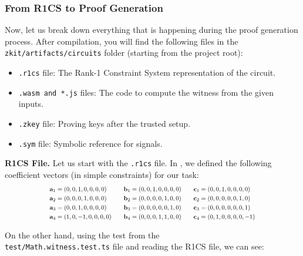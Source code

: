 \documentclass[../lecture-notes-105x135.tex]{subfiles}
\begin{document}
    \subsubsection{From R1CS to Proof Generation}

    Now, let us break down everything that is happening during the proof
    generation process. After compilation, you will find the following files in
    the \texttt{zkit/artifacts/circuits} folder (starting from the project
    root):
    \begin{itemize}
        \item \texttt{.r1cs} file: The Rank-1 Constraint System representation of the circuit.
        \item \texttt{.wasm and *.js} files: The code to compute the witness from the given inputs.
        \item \texttt{.zkey} file: Proving keys after the trusted setup.
        \item \texttt{.sym} file: Symbolic reference for signals.
    \end{itemize}

    \textbf{R1CS File.} Let us start with the \texttt{.r1cs} file. In ,
    we defined the following coefficient vectors (in simple constraints) for our
    task:
    \begin{equation*}
        \scalebox{0.75}{$   
        \begin{aligned}
            \mathbf{a}_1 &= (0, 0, 1, 0, 0, 0, 0) & \quad \mathbf{b}_1 &= (0, 0, 1, 0, 0, 0, 0) & \quad \mathbf{c}_1 &= (0, 0, 1, 0, 0, 0, 0) \\
            \mathbf{a}_2 &= (0, 0, 0, 1, 0, 0, 0) & \quad \mathbf{b}_2 &= (0, 0, 0, 0, 1, 0, 0) & \quad \mathbf{c}_2 &= (0, 0, 0, 0, 0, 1, 0) \\
            \mathbf{a}_3 &= (0, 0, 1, 0, 0, 0, 0) & \quad \mathbf{b}_3 &= (0, 0, 0, 0, 0, 1, 0) & \quad \mathbf{c}_3 &= (0, 0, 0, 0, 0, 0, 1) \\
            \mathbf{a}_4 &= (1, 0, -1, 0, 0, 0, 0) & \quad \mathbf{b}_4 &= (0, 0, 0, 1, 1, 0, 0) & \quad \mathbf{c}_4 &= (0, 1, 0, 0, 0, 0, -1)
        \end{aligned}
        $}
    \end{equation*}

    On the other hand, using the test from the \\ \texttt{test/Math.witness.test.ts} file and reading the R1CS file, we can see:
\end{document}
